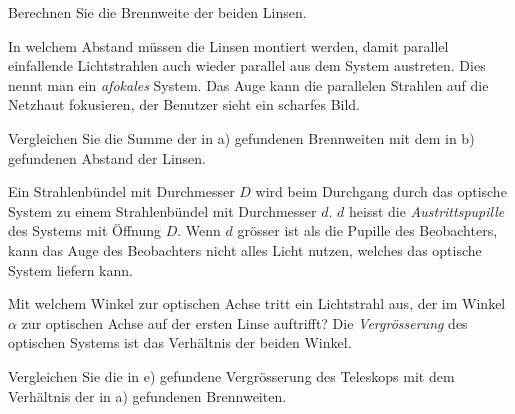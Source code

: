 \begin{teilaufgaben}
\item
Berechnen Sie die Brennweite der beiden Linsen.
\item
In welchem Abstand müssen die Linsen montiert werden, damit parallel
einfallende Lichtstrahlen auch wieder parallel aus dem System
austreten.
Dies nennt man ein {\em afokales} System.
Das Auge kann die parallelen Strahlen auf die Netzhaut fokusieren,
der Benutzer sieht ein scharfes Bild.
\item
Vergleichen Sie die Summe der in a) gefundenen Brennweiten mit dem
in b) gefundenen Abstand der Linsen.
\item
Ein Strahlenbündel mit Durchmesser $D$ wird beim Durchgang durch das
optische System zu einem Strahlenbündel mit Durchmesser $d$.
$d$ heisst die {\em Austrittspupille} des Systems mit Öffnung $D$.
Wenn $d$ grösser ist als die Pupille des Beobachters, kann das Auge des
Beobachters nicht alles Licht nutzen, welches das optische System liefern
kann.
\item
Mit welchem Winkel zur optischen Achse tritt ein Lichtstrahl aus,
der im Winkel $\alpha$ zur optischen Achse auf der ersten Linse
auftrifft?
Die {\em Vergrösserung} des optischen Systems ist das Verhältnis der
beiden Winkel.
\item
Vergleichen Sie die in e) gefundene Vergrösserung des Teleskops
mit dem Verhältnis der in a) gefundenen Brennweiten.
\end{teilaufgaben}

